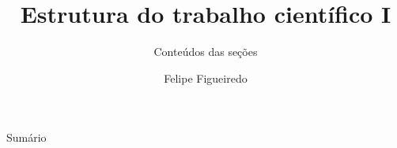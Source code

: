 \documentclass{beamer}
\title%
{Estrutura do trabalho científico I}
\subtitle
{Conteúdos das seções} %
\author%
{Felipe Figueiredo}%
\institute[INTO] %
{Instituto Nacional de Traumatologia e Ortopedia
}
\date%
{}
\begin{document}
\begin{frame}
  \titlepage
\end{frame}

\begin{frame}{Sumário}
  \tableofcontents
\end{frame}








\end{document}
